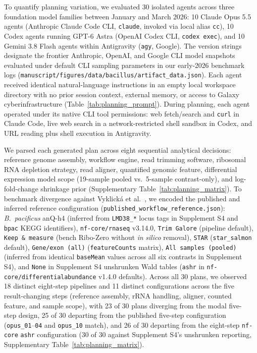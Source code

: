 \documentclass[11pt,letterpaper]{article}
\begin{document}
To quantify planning variation, we evaluated 30 isolated agents across three foundation model families between January and March 2026: 10 Claude Opus 5.5 agents (Anthropic Claude Code CLI, \texttt{claude}, invoked via local alias \texttt{cc}), 10 Codex agents running GPT-6 Astra (OpenAI Codex CLI, \texttt{codex exec}), and 10 Gemini 3.8 Flash agents within Antigravity (\texttt{agy}, Google). The version strings designate the frontier Anthropic, OpenAI, and Google CLI model snapshots evaluated under default CLI sampling parameters in our early-2026 benchmark logs (\nolinkurl{manuscript/figures/data/bacillus/artifact_data.json}). Each agent received identical natural-language instructions in an empty local workspace directory with no prior session context, external memory, or access to Galaxy cyberinfrastructure (Table~\ref{tab:planning_prompt}). During planning, each agent operated under its native CLI tool permissions: web fetch/search and \texttt{curl} in Claude Code, live web search in a network-restricted shell sandbox in Codex, and URL reading plus shell execution in Antigravity.

We parsed each generated plan across eight sequential analytical decisions: reference genome assembly, workflow engine, read trimming software, ribosomal RNA depletion strategy, read aligner, quantified genomic feature, differential expression model scope (19-sample pooled vs.\ 5-sample contrast-only), and log-fold-change shrinkage prior (Supplementary Table~\ref{tab:planning_matrix}). To benchmark divergence against Vyklick{\'a} et al.\ \cite{vyklicka2026}, we encoded the published and inferred reference configuration (\nolinkurl{published_workflow_reference.json}): \textit{B.\ pacificus} anQ-h4 (inferred from \texttt{LMD38\_*} locus tags in Supplement S4 and \texttt{bpac} KEGG identifiers), \texttt{nf-core/rnaseq} v3.14.0, \texttt{Trim Galore} (pipeline default), \texttt{Keep \& measure} (bench Ribo-Zero without \textit{in silico} removal), \texttt{STAR} (\texttt{star\_salmon} default), \texttt{Gene/exon (all)} (\texttt{featureCounts} matrix), \texttt{All samples (pooled)} (inferred from identical \texttt{baseMean} values across all six contrasts in Supplement S4), and \texttt{None} in Supplement S4 unshrunken Wald tables (\texttt{ashr} in \texttt{nf-core/differentialabundance} v1.4.0 defaults). Across all 30 plans, we observed 18 distinct eight-step pipelines and 11 distinct configurations across the five result-changing steps (reference assembly, rRNA handling, aligner, counted feature, and sample scope), with 23 of 30 plans diverging from the modal five-step design, 25 of 30 departing from the published five-step configuration (\texttt{opus\_01}--\texttt{04} and \texttt{opus\_10} match), and 26 of 30 departing from the eight-step \texttt{nf-core} \texttt{ashr} configuration (30 of 30 against Supplement S4's unshrunken reporting, Supplementary Table~\ref{tab:planning_matrix}).
\end{document}
